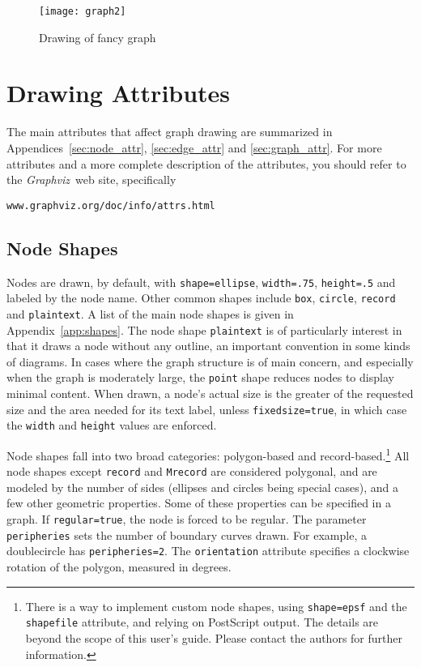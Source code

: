 \documentclass[11pt]{article}
\def\graphviz{{\it Graphviz}}
\begin{document}
{\begin{figure}[p]
	\centerline {
		\texttt{[image: graph2]}
	}
    \caption{Drawing of fancy graph}
    \label{fig:drawing2}
\end{figure}

\section{Drawing Attributes}

The main attributes that affect graph drawing
are summarized in Appendices~\ref{sec:node_attr}, 
\ref{sec:edge_attr} and \ref{sec:graph_attr}.
For more attributes and a more complete description of the attributes, you
should refer to the \graphviz\ web site, specifically
\begin{center}
{\tt www.graphviz.org/doc/info/attrs.html}
\end{center}

\subsection{Node Shapes}
\label{sect:shape}

Nodes are drawn, by default, with {\tt shape=ellipse}, {\tt width=.75},
{\tt height=.5} and labeled by the node name.
Other common shapes include {\tt box}, {\tt circle}, {\tt record} 
and {\tt plaintext}.
A list of the main node shapes is given in Appendix~\ref{app:shapes}.
The node shape {\tt plaintext} is of particularly interest in
that it draws a node without any outline, an important convention
in some kinds of diagrams. In cases where the graph structure is of
main concern, and especially when the graph is moderately large, the
{\tt point} shape reduces nodes to display minimal content.
When drawn, a node's actual size is the greater of the requested
size and the area needed for its text label, unless {\tt fixedsize=true},
in which case the {\tt width} and {\tt height} values are enforced.

Node shapes fall into two broad categories: polygon-based and
record-based.\footnote{There is a way to implement custom node shapes,
using {\tt shape=epsf} and the {\tt shapefile} attribute, and
relying on PostScript output.
The details are beyond the scope of this user's guide.
Please contact the authors for further information.} All node
shapes except {\tt record} and {\tt Mrecord} are considered polygonal,
and are modeled by the number of sides (ellipses and circles being
special cases), and a few other geometric properties. Some of these
properties can be specified in a graph. If {\tt regular=true}, the
node is forced to be regular. The parameter {\tt peripheries} sets
the number of boundary curves drawn. For example, a doublecircle 
has {\tt peripheries=2}.
The {\tt orientation} attribute specifies a clockwise rotation of the 
polygon, measured in degrees.

}
\end{document}
